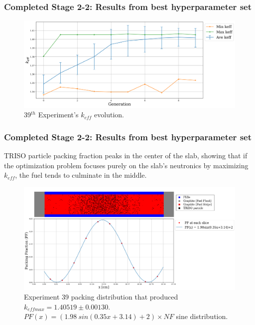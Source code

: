 \begin{frame}
    \frametitle{Completed Stage 2-2: Results from best hyperparameter set}
    \begin{figure}[]
        \centering
        \includegraphics[width=\linewidth]{../docs/figures/keff_conv_39.png}
        \caption{39$^{th}$ Experiment's $k_{eff}$ evolution.}
    \end{figure}
\end{frame}

\begin{frame}
    \frametitle{Completed Stage 2-2: Results from best hyperparameter set}
    TRISO particle packing fraction peaks in the center 
    of the slab, showing that if the optimization problem focuses purely on the 
    slab's neutronics by maximizing $k_{eff}$, the fuel tends to culminate in the 
    middle. 

    \begin{figure}[]
        \centering
        \includegraphics[width=0.8\linewidth]{../docs/figures/triso_distribution_sine_39.png} 
        \caption{Experiment 39 packing distribution that produced 
        $k_{eff max} = 1.40519 \pm 0.00130$. 
        $PF(x) = (1.98\ sin(0.35x+3.14)+2)  \times NF$ sine distribution. }
        \label{fig:triso_distribution_sine_39}
    \end{figure}
\end{frame}